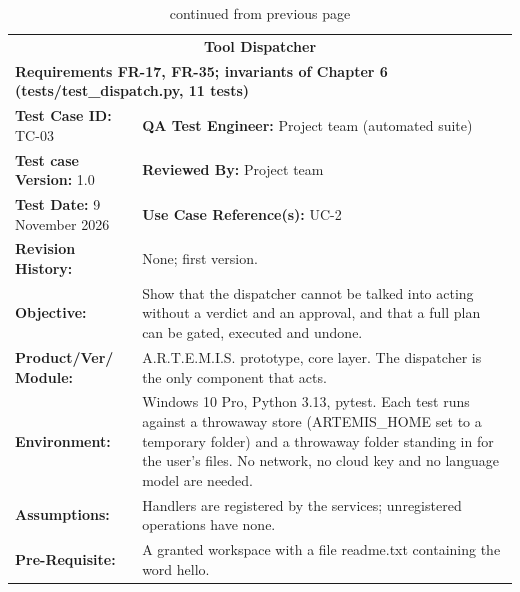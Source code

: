 \documentclass{FastFyp}
\begin{document}
{\small
{}
\begin{longtable}{|p{2.4cm}p{5.0cm}p{2.4cm}p{3.8cm}|}
\caption{Test case TC-03: tool dispatcher.}\label{tab:tc3}\\*
\endfirsthead
\caption[]{continued from previous page}\\*
\endhead
\hline
\multicolumn{4}{|c|}{\textbf{Tool Dispatcher}} \\* \hline
\multicolumn{4}{|p{14.8cm}|}{\textbf{Requirements FR-17, FR-35; invariants of Chapter 6 (tests/test\_dispatch.py, 11 tests)}} \\* \hline
\multicolumn{2}{|p{7.8cm}|}{\textbf{Test Case ID:} TC-03} &
  \multicolumn{2}{p{6.6cm}|}{\textbf{QA Test Engineer:} Project team (automated suite)} \\* \hline
\multicolumn{2}{|p{7.8cm}|}{\textbf{Test case Version:} 1.0} &
  \multicolumn{2}{p{6.6cm}|}{\textbf{Reviewed By:} Project team} \\* \hline
\multicolumn{2}{|p{7.8cm}|}{\textbf{Test Date:} 9 November 2026} &
  \multicolumn{2}{p{6.6cm}|}{\textbf{Use Case Reference(s):} UC-2} \\ \hline
\multicolumn{1}{|p{2.4cm}|}{\textbf{Revision History:}} &
  \multicolumn{3}{p{12.0cm}|}{None; first version.} \\ \hline
\multicolumn{1}{|p{2.4cm}|}{\textbf{Objective:}} &
  \multicolumn{3}{p{12.0cm}|}{Show that the dispatcher cannot be talked into acting without a verdict and an approval, and that a full plan can be gated, executed and undone.} \\ \hline
\multicolumn{1}{|p{2.4cm}|}{\textbf{Product/Ver/ Module:}} &
  \multicolumn{3}{p{12.0cm}|}{A.R.T.E.M.I.S. prototype, core layer. The dispatcher is the only component that acts.} \\ \hline
\multicolumn{1}{|p{2.4cm}|}{\textbf{Environment:}} &
  \multicolumn{3}{p{12.0cm}|}{Windows 10 Pro, Python 3.13, pytest. Each test runs against a throwaway store (ARTEMIS\_HOME set to a temporary folder) and a throwaway folder standing in for the user's files. No network, no cloud key and no language model are needed.} \\ \hline
\multicolumn{1}{|p{2.4cm}|}{\textbf{Assumptions:}} &
  \multicolumn{3}{p{12.0cm}|}{Handlers are registered by the services; unregistered operations have none.} \\ \hline
\multicolumn{1}{|p{2.4cm}|}{\textbf{Pre-Requisite:}} &
  \multicolumn{3}{p{12.0cm}|}{A granted workspace with a file readme.txt containing the word hello.} \\ \hline

\end{longtable}}
\end{document}
